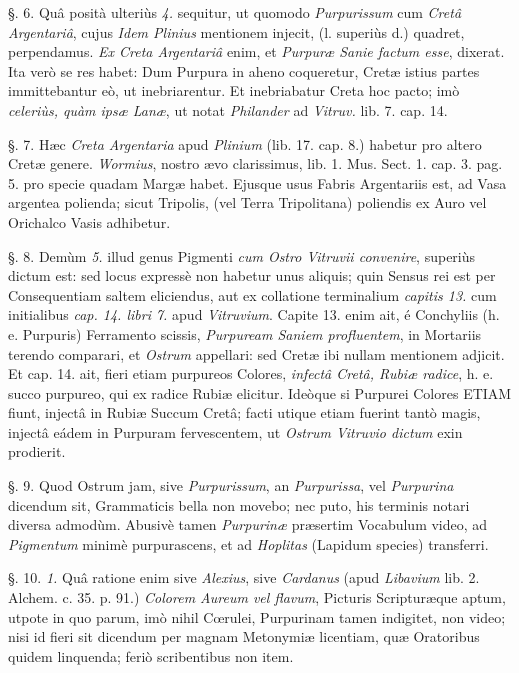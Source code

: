 \documentclass[a4paper, 11pt, oneside, polutonikogreek, german]{article}
\begin{document}
§. 6. Quâ posità ulteriùs \emph{4.} sequitur, ut quomodo \emph{Purpurissum} cum \emph{Cretâ Argentariâ}, cujus \emph{Idem Plinius} mentionem injecit, (l. superiùs d.) quadret, perpendamus. \emph{Ex Creta Argentariâ} enim, et \emph{Purpuræ Sanie factum esse}, dixerat. Ita verò se res habet: Dum Purpura in aheno coqueretur, Cretæ istius partes immittebantur eò, ut inebriarentur. Et inebriabatur Creta hoc pacto; imò \emph{celeriùs, quàm ipsæ Lanæ}, ut notat \emph{Philander} ad \emph{Vitruv.} lib. 7. cap. 14.

§. 7. Hæc \emph{Creta Argentaria} apud \emph{Plinium} (lib. 17. cap. 8.) habetur pro altero Cretæ genere. \emph{Wormius}, nostro ævo clarissimus, lib. 1. Mus. Sect. 1. cap. 3. pag. 5. pro specie quadam Margæ habet. Ejusque usus Fabris Argentariis est, ad Vasa argentea polienda; sicut Tripolis, (vel Terra Tripolitana) poliendis ex Auro vel Orichalco Vasis adhibetur.

§. 8. Demùm \emph{5.} illud genus Pigmenti \emph{cum Ostro Vitruvii convenire}, superiùs dictum est: sed locus expressè non habetur unus aliquis; quin Sensus rei est per Consequentiam saltem eliciendus, aut ex collatione terminalium \emph{capitis 13.} cum initialibus \emph{cap. 14. libri 7.} apud \emph{Vitruvium}. Capite 13. enim ait, é Conchyliis (h. e. Purpuris) Ferramento scissis, \emph{Purpuream Saniem profluentem}, in Mortariis terendo comparari, et \emph{Ostrum} appellari: sed Cretæ ibi nullam mentionem adjicit. Et cap. 14. ait, fieri etiam purpureos Colores, \emph{infectâ Cretâ, Rubiæ radice}, h. e. succo purpureo, qui ex radice Rubiæ elicitur. Ideòque si Purpurei Colores ETIAM fiunt, injectâ in Rubiæ Succum Cretâ; facti utique etiam fuerint tantò magis, injectâ eádem in Purpuram fervescentem, ut \emph{Ostrum Vitruvio dictum} exin prodierit.

§. 9. Quod Ostrum jam, sive \emph{Purpurissum}, an \emph{Purpurissa}, vel \emph{Purpurina} dicendum sit, Grammaticis bella non movebo; nec puto, his terminis notari diversa admodùm. Abusivè tamen \emph{Purpurinæ} præsertim Vocabulum video, ad \emph{Pigmentum} minimè purpurascens, et ad \emph{Hoplitas} (Lapidum species) transferri.

§. 10. \emph{1.} Quâ ratione enim sive \emph{Alexius}, sive \emph{Cardanus} (apud \emph{Libavium} lib. 2. Alchem. c. 35. p. 91.) \emph{Colorem Aureum vel flavum}, Picturis Scripturæque aptum, utpote in quo parum, imò nihil Cœrulei, Purpurinam tamen indigitet, non video; nisi id fieri sit dicendum per magnam Metonymiæ licentiam, quæ Oratoribus quidem linquenda; feriò scribentibus non item.
\end{document}
